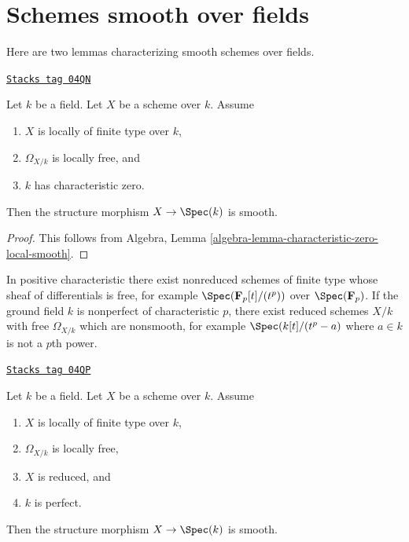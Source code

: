 \section{Schemes smooth over fields}
\label{varieties-section-smooth}
Here are two lemmas characterizing smooth schemes over fields.

\begin{lemma}
\label{varieties-lemma-char-zero-differentials-free-smooth}
\href{https://stacks.math.columbia.edu/tag/04QN}{\texttt{Stacks tag 04QN}}

Let $k$ be a field. Let $X$ be a scheme over $k$.
Assume
\begin{enumerate}
\item $X$ is locally of finite type over $k$,
\item $\Omega_{X/k}$ is locally free, and
\item $k$ has characteristic zero.
\end{enumerate}
Then the structure morphism $X \to \Spec(k)$ is smooth.
\end{lemma}

\begin{proof}
This follows from
Algebra, Lemma \ref{algebra-lemma-characteristic-zero-local-smooth}.
\end{proof}

In positive characteristic there exist nonreduced schemes
of finite type whose sheaf of differentials is free, for example
$\Spec(\mathbf{F}_p[t]/(t^p))$ over $\Spec(\mathbf{F}_p)$.
If the ground field $k$ is nonperfect of characteristic $p$,
there exist reduced schemes $X/k$ with free $\Omega_{X/k}$ which are
nonsmooth, for example $\Spec(k[t]/(t^p-a)$ where $a \in k$
is not a $p$th power.

\begin{lemma}
\label{varieties-lemma-char-p-differentials-free-smooth}
\href{https://stacks.math.columbia.edu/tag/04QP}{\texttt{Stacks tag 04QP}}

Let $k$ be a field. Let $X$ be a scheme over $k$.
Assume
\begin{enumerate}
\item $X$ is locally of finite type over $k$,
\item $\Omega_{X/k}$ is locally free,
\item $X$ is reduced, and
\item $k$ is perfect.
\end{enumerate}
Then the structure morphism $X \to \Spec(k)$ is smooth.
\end{lemma}

